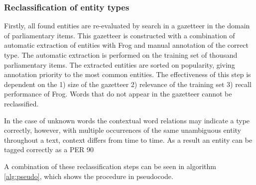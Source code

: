 \subsubsection{Reclassification of entity types}
Firstly, all found entities are re-evaluated by search in a gazetteer in the domain of parliamentary items. This gazetteer is constructed with a combination of automatic extraction of entities with Frog and manual annotation of the correct type. The automatic extraction is performed on the training set of thousand parliamentary items. The extracted entities are sorted on popularity, giving annotation priority to the most common entities. The effectiveness of this step is dependent on the 1) size of the gazetteer 2) relevance of the training set 3) recall performance of Frog. Words that do not appear in the gazetteer cannot be reclassified.

In the case of unknown words the contextual word relations may indicate a type correctly, however, with multiple occurrences of the same unambiguous entity throughout a text, context differs from time to time. As a result an entity can be tagged correctly as a PER 90%

A combination of these reclassification steps can be seen in algorithm \ref{alg:pseudo}, which shows the procedure in pseudocode.

